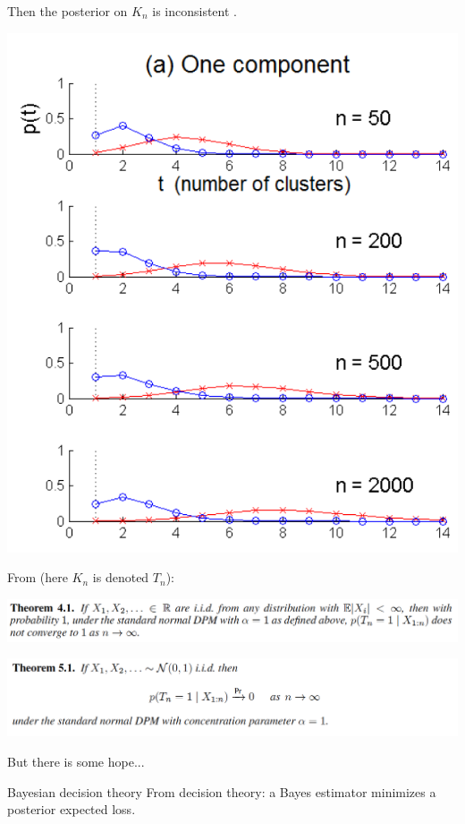 Then the \alert{posterior on $K_n$ is inconsistent} \citep{miller2013simple}.

\includegraphics[width=\textwidth]{figures_julyan/mixtures/miller_DP}


From \citet{miller2013simple} (here $K_n$ is denoted $T_n$):\bigskip

\includegraphics[width=\textwidth]{figures_julyan/mixtures/miller_inconsistency1}\bigskip

\includegraphics[width=\textwidth]{figures_julyan/mixtures/miller_inconsistency2}\bigskip


But there is some hope...




{Bayesian decision theory}
	From decision theory: a Bayes estimator minimizes a posterior expected loss.
	
